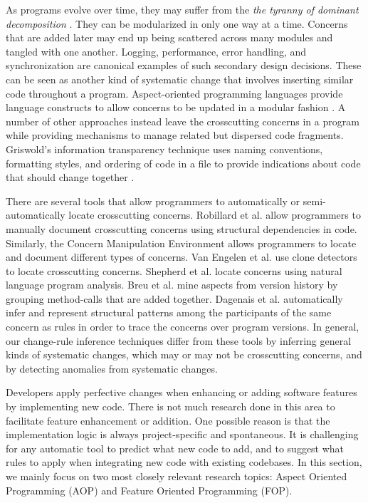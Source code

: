 \documentclass[runningheads,a4paper]{llncs}
\begin{document}
As programs evolve over time, they may suffer from the {\it the tyranny of dominant decomposition} \cite{Tarr1999}. They can be modularized in only one way at a time. Concerns that are added later may end up being scattered across many modules and tangled with one another.  Logging, performance, error handling, and synchronization are canonical examples of such secondary design decisions.  These can be seen as another kind of systematic change that involves inserting similar code throughout a program.  Aspect-oriented programming languages provide language constructs to allow concerns to be updated in a modular fashion \cite{Kiczales2001}. A number of other approaches instead leave the crosscutting concerns in a program while providing mechanisms to manage related but dispersed code fragments.  Griswold's information transparency technique uses naming conventions, formatting styles, and ordering of code in a file to provide indications about code that should change together \cite{Griswold2001}. 

There are several tools that allow programmers to automatically or semi-automatically locate crosscutting concerns. Robillard et al. \cite{Robillard2003} allow programmers to manually document crosscutting concerns using structural dependencies in code. Similarly, the Concern Manipulation Environment \cite{Harrison2005} allows programmers to locate and document different types of concerns. 
Van Engelen et al. \cite{VanEngelen2005} use clone detectors to locate crosscutting concerns. Shepherd et al. \cite{Shepherd2007} locate concerns using natural language program analysis.  Breu et al. \cite{Breu2006} mine aspects from version history by grouping method-calls that are added together. Dagenais et al. \cite{Dagenais2007} automatically infer and represent structural patterns among the participants of the same concern as rules in order to trace the concerns over program versions. In general, our change-rule inference techniques differ from these tools by inferring general kinds of systematic changes, which may or may not be crosscutting concerns, and by detecting anomalies from systematic changes. 

Developers apply perfective changes when enhancing or adding software features by implementing new code. There is not much research done in this area to facilitate feature enhancement or addition. One possible reason is that the implementation logic is always project-specific and spontaneous. It is challenging for any automatic tool to predict what new code to add, and to suggest what rules to apply when integrating new code with existing codebases. In this section, we mainly focus on two most closely relevant research topics: Aspect Oriented Programming (AOP) and Feature Oriented Programming (FOP).
\end{document}
